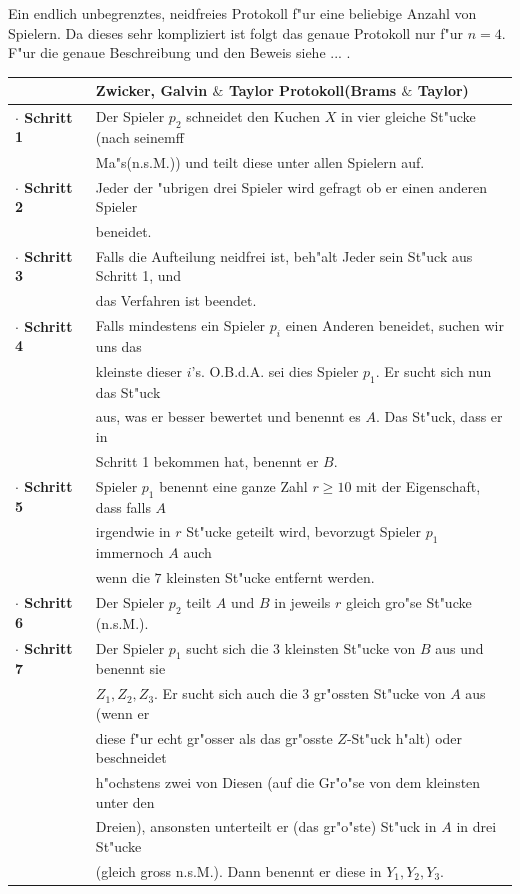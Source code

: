 \documentclass[11pt, a4paper, twoside]{article}
\newcommand{\wf}{\color{white}}
\newcommand{\tf}{\color{black}}
\numberwithin{equation}{section}
\begin{document}
\newline
\newline
\newline
Ein endlich unbegrenztes, neidfreies Protokoll f"ur eine beliebige Anzahl von Spielern. Da dieses sehr kompliziert ist folgt das genaue Protokoll nur f"ur $n=4$. F"ur die genaue Beschreibung und den Beweis siehe ... .\\
\newline
\begin{tabular}{|ll|}
\hline
&\textbf{Zwicker, Galvin $\&$ Taylor Protokoll(Brams $\&$ Taylor)}\\
\hline
\textbf{$\cdot$ Schritt 1}&Der Spieler $p_2$ schneidet den Kuchen $X$ in vier gleiche St"ucke (nach seinem\wf ff\tf\\&Ma"s(n.s.M.)) und teilt diese unter allen Spielern auf.\\
\textbf{$\cdot$ Schritt 2}&Jeder der "ubrigen drei Spieler wird gefragt ob er einen anderen Spieler\\&beneidet.\\
\textbf{$\cdot$ Schritt 3}&Falls die Aufteilung neidfrei ist, beh"alt Jeder sein St"uck aus Schritt 1, und\\&das Verfahren ist beendet.\\ 
\textbf{$\cdot$ Schritt 4}&Falls mindestens ein Spieler $p_i$ einen Anderen beneidet, suchen wir uns das\\&kleinste dieser $i$'s. O.B.d.A. sei dies Spieler $p_1$. Er sucht sich nun das St"uck\\&aus, was er besser bewertet und benennt es $A$. Das St"uck, dass er in\\&Schritt 1 bekommen hat, benennt er $B$.\\
\textbf{$\cdot$ Schritt 5}& Spieler $p_1$ benennt eine ganze Zahl $r \geq 10$ mit der Eigenschaft, dass falls $A$\\&irgendwie in $r$ St"ucke geteilt wird, bevorzugt Spieler $p_1$ immernoch $A$ auch\\&wenn die $7$ kleinsten St"ucke entfernt werden.\\
\textbf{$\cdot$ Schritt 6}&Der Spieler $p_2$ teilt $A$ und $B$ in jeweils $r$ gleich gro"se St"ucke (n.s.M.).\\
\textbf{$\cdot$ Schritt 7}&Der Spieler $p_1$ sucht sich die 3 kleinsten St"ucke von $B$ aus und benennt sie\\&$Z_1,Z_2,Z_3$. Er sucht sich auch die 3 gr"ossten St"ucke von $A$ aus (wenn er\\&diese f"ur echt gr"osser als das gr"osste $Z$-St"uck h"alt) oder beschneidet\\&h"ochstens zwei von Diesen (auf die Gr"o"se von dem kleinsten unter den\\&Dreien), ansonsten unterteilt er (das gr"o"ste) St"uck in $A$ in drei St"ucke\\&(gleich gross n.s.M.). Dann benennt er diese in $Y_1,Y_2,Y_3$.\\
\hline
\end{tabular}
\end{document}
